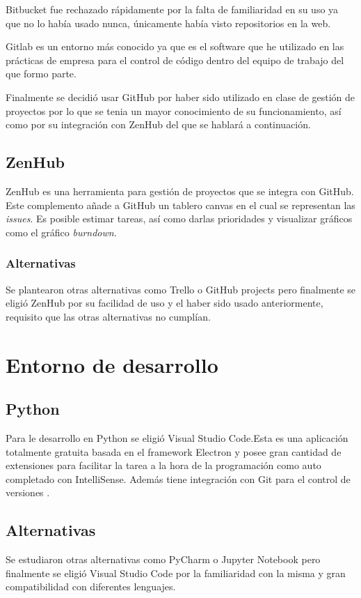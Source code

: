 Bitbucket fue rechazado rápidamente por la falta de familiaridad en su uso ya que no lo había usado nunca, únicamente había visto repositorios en la web.

Gitlab es un entorno más conocido ya que es el software que he utilizado en las prácticas de empresa para el control de código dentro del equipo de trabajo del que formo parte.

Finalmente se decidió usar GitHub por haber sido utilizado en clase de gestión de proyectos por lo que se tenia un mayor conocimiento de su funcionamiento, así como por su integración con ZenHub del que se hablará a continuación.

\subsection{ZenHub}\label{ZenHub}
ZenHub es una herramienta para gestión de proyectos que se integra con GitHub. Este complemento añade a GitHub un tablero canvas en el cual se representan las \emph{issues}. Es posible estimar tareas, así como darlas prioridades y visualizar gráficos como el gráfico \emph{burndown}. \cite{zenhub}

\subsubsection{Alternativas}\label{AlternativasZotero}
Se plantearon otras alternativas como Trello o GitHub projects pero finalmente se eligió  ZenHub por su facilidad de uso y el haber sido usado anteriormente, requisito que las otras alternativas no cumplían.

\section{Entorno de desarrollo}\label{IDE}
	\subsection{Python}\label{Python}
Para le desarrollo en Python se eligió Visual Studio Code.Esta es una aplicación totalmente gratuita basada en el framework Electron y posee gran cantidad de extensiones para facilitar la tarea a la hora de la programación como auto completado con IntelliSense. Además tiene integración con Git para el control de versiones \cite{wiki:vscode_wiki,vscode}.

\subsection{Alternativas}\label{AlternativasIDE}
Se estudiaron otras alternativas como PyCharm o Jupyter Notebook pero finalmente se eligió Visual Studio Code por la familiaridad con la misma y gran compatibilidad con diferentes lenguajes.

